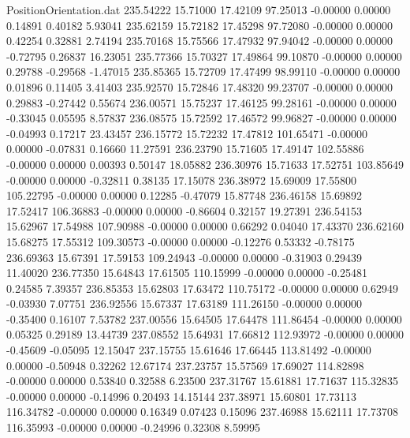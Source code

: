 \begin{filecontents}{PositionOrientation.dat}
 235.54222   15.71000   17.42109    97.25013   -0.00000    0.00000    0.14891    0.40182    5.93041
 235.62159   15.72182   17.45298    97.72080   -0.00000    0.00000    0.42254    0.32881    2.74194
 235.70168   15.75566   17.47932    97.94042   -0.00000    0.00000   -0.72795    0.26837   16.23051
 235.77366   15.70327   17.49864    99.10870   -0.00000    0.00000    0.29788   -0.29568   -1.47015
 235.85365   15.72709   17.47499    98.99110   -0.00000    0.00000    0.01896    0.11405    3.41403
 235.92570   15.72846   17.48320    99.23707   -0.00000    0.00000    0.29883   -0.27442    0.55674
 236.00571   15.75237   17.46125    99.28161   -0.00000    0.00000   -0.33045    0.05595    8.57837
 236.08575   15.72592   17.46572    99.96827   -0.00000    0.00000   -0.04993    0.17217   23.43457
 236.15772   15.72232   17.47812   101.65471   -0.00000    0.00000   -0.07831    0.16660   11.27591
 236.23790   15.71605   17.49147   102.55886   -0.00000    0.00000    0.00393    0.50147   18.05882
 236.30976   15.71633   17.52751   103.85649   -0.00000    0.00000   -0.32811    0.38135   17.15078
 236.38972   15.69009   17.55800   105.22795   -0.00000    0.00000    0.12285   -0.47079   15.87748
 236.46158   15.69892   17.52417   106.36883   -0.00000    0.00000   -0.86604    0.32157   19.27391
 236.54153   15.62967   17.54988   107.90988   -0.00000    0.00000    0.66292    0.04040   17.43370
 236.62160   15.68275   17.55312   109.30573   -0.00000    0.00000   -0.12276    0.53332   -0.78175
 236.69363   15.67391   17.59153   109.24943   -0.00000    0.00000   -0.31903    0.29439   11.40020
 236.77350   15.64843   17.61505   110.15999   -0.00000    0.00000   -0.25481    0.24585    7.39357
 236.85353   15.62803   17.63472   110.75172   -0.00000    0.00000    0.62949   -0.03930    7.07751
 236.92556   15.67337   17.63189   111.26150   -0.00000    0.00000   -0.35400    0.16107    7.53782
 237.00556   15.64505   17.64478   111.86454   -0.00000    0.00000    0.05325    0.29189   13.44739
 237.08552   15.64931   17.66812   112.93972   -0.00000    0.00000   -0.45609   -0.05095   12.15047
 237.15755   15.61646   17.66445   113.81492   -0.00000    0.00000   -0.50948    0.32262   12.67174
 237.23757   15.57569   17.69027   114.82898   -0.00000    0.00000    0.53840    0.32588    6.23500
 237.31767   15.61881   17.71637   115.32835   -0.00000    0.00000   -0.14996    0.20493   14.15144
 237.38971   15.60801   17.73113   116.34782   -0.00000    0.00000    0.16349    0.07423    0.15096
 237.46988   15.62111   17.73708   116.35993   -0.00000    0.00000   -0.24996    0.32308    8.59995

\end{filecontents}
